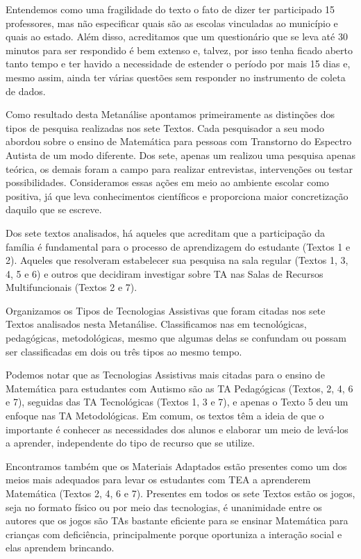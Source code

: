 \documentclass[portuguese]{textolivre}
\begin{document}
Entendemos como uma fragilidade do texto o fato de \textcite{gubert2022} dizer
ter participado 15 professores, mas não especificar quais são as escolas
vinculadas ao município e quais ao estado. Além disso, acreditamos que
um questionário que se leva até 30 minutos para ser respondido é bem
extenso e, talvez, por isso tenha ficado aberto tanto tempo e ter havido
a necessidade de estender o período por mais 15 dias e, mesmo assim,
ainda ter várias questões sem responder no instrumento de coleta de
dados.

Como resultado desta Metanálise apontamos primeiramente as distinções
dos tipos de pesquisa realizadas nos sete Textos. Cada pesquisador a seu
modo abordou sobre o ensino de Matemática para pessoas com Transtorno do
Espectro Autista de um modo diferente. Dos sete, apenas um realizou uma
pesquisa apenas teórica, os demais foram a campo para realizar
entrevistas, intervenções ou testar possibilidades. Consideramos essas
ações em meio ao ambiente escolar como positiva, já que leva
conhecimentos científicos e proporciona maior concretização daquilo que
se escreve.

Dos sete textos analisados, há aqueles que acreditam que a participação
da família é fundamental para o processo de aprendizagem do estudante
(Textos 1 e 2). Aqueles que resolveram estabelecer sua pesquisa na sala
regular (Textos 1, 3, 4, 5 e 6) e outros que decidiram investigar sobre
TA nas Salas de Recursos Multifuncionais (Textos 2 e 7).

Organizamos os Tipos de Tecnologias Assistivas que foram citadas nos
sete Textos analisados nesta Metanálise. Classificamos nas em
tecnológicas, pedagógicas, metodológicas, mesmo que algumas delas se
confundam ou possam ser classificadas em dois ou três tipos ao mesmo
tempo.

Podemos notar que as Tecnologias Assistivas mais citadas para o ensino
de Matemática para estudantes com Autismo são as TA Pedagógicas (Textos,
2, 4, 6 e 7), seguidas das TA Tecnológicas (Textos 1, 3 e 7), e apenas o
Texto 5 deu um enfoque nas TA Metodológicas. Em comum, os textos têm a
ideia de que o importante é conhecer as necessidades dos alunos e
elaborar um meio de levá-los a aprender, independente do tipo de recurso
que se utilize.

Encontramos também que os Materiais Adaptados estão presentes como um
dos meios mais adequados para levar os estudantes com TEA a aprenderem
Matemática (Textos 2, 4, 6 e 7). Presentes em todos os sete Textos estão
os jogos, seja no formato físico ou por meio das tecnologias, é
unanimidade entre os autores que os jogos são TAs bastante eficiente
para se ensinar Matemática para crianças com deficiência, principalmente
porque oportuniza a interação social e elas aprendem brincando.
\end{document}
